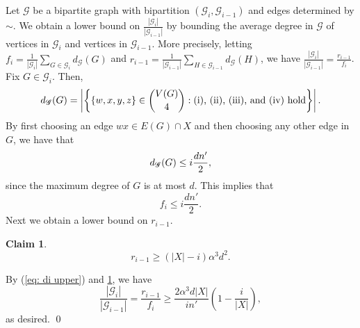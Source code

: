 \documentclass[11pt]{article}
\theoremstyle{plain}
\newtheorem{claim}{Claim}[thm]
\begin{document}
    Let $\mathscr G$ be a bipartite graph with bipartition $(\mathcal G_i,\mathcal G_{i-1})$ and edges determined by $\sim$. We obtain a lower bound on $\frac{|\mathcal G_i|}{|\mathcal G_{i-1}|}$ by bounding the average degree in $\mathscr G$ of vertices in $\mathcal G_i$ and vertices in $\mathcal G_{i-1}$. More precisely, letting $f_i = \frac{1}{|\mathcal G_i|}\sum_{G \in \mathcal G_i}d_\mathscr G(G)$ and $r_{i-1} = \frac{1}{|\mathcal G_{i-1}|}\sum_{H \in \mathcal G_{i-1}}d_\mathscr G(H)$, we have $\frac{|\mathcal G_i|}{|\mathcal G_{i-1}|} = \frac{r_{i-1}}{f_i}$. Fix $G \in \mathcal G_i$. Then, 
    \begin{equation}
        d_\mathscr G(G) = \left|\left\{\{w,x,y,z\} \in \binom{V(G)}{4} \mathrel : \text{(i), (ii), (iii), and (iv) hold}\right\}\right|. \notag
    \end{equation}
    By first choosing an edge $wx \in E(G) \cap X$ and then choosing any other edge in $G$, we have that 
    \begin{equation}
        d_{\mathscr G}(G) \leq i\frac{dn'}{2}, \notag
    \end{equation}
    since the maximum degree of $G$ is at most $d$. This implies that
    \begin{equation}\label{eq: di upper}
        f_i \leq i\frac{dn'}{2}.
    \end{equation}
    Next we obtain a lower bound on $r_{i-1}$.  
    \begin{claim}\label{clm: switching expectation}
        \[
 r_{i-1} \geq (|X| - i)\alpha^3d^2.
        \]
    \end{claim}
By (\ref{eq: di upper}) and \cref{clm: switching expectation}, we have 
    \begin{equation*} %
        \frac{|\mathcal G_i|}{|\mathcal G_{i-1}|}=\frac{r_{i-1}}{f_i} \geq \frac{2\alpha^3d|X|}{in'}\left(1 - \frac{i}{|X|}\right),
    \end{equation*}
    as desired.
    \qed
\end{document}
